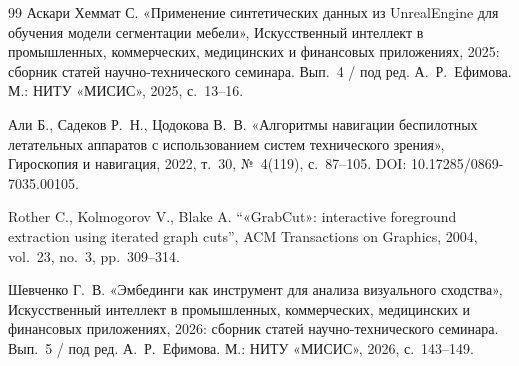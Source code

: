 \documentclass{misisarticle}
\begin{document}
\begin{thebibliography}{99}
 Аскари Хеммат С. «Применение синтетических данных из UnrealEngine для обучения модели сегментации мебели», Искусственный интеллект в промышленных, коммерческих, медицинских и финансовых приложениях, 2025: сборник статей научно-технического семинара. Вып.~4 / под ред. А.~Р.~Ефимова. М.: НИТУ «МИСИС», 2025, с.~13--16.

 Али Б., Садеков Р.~Н., Цодокова В.~В. «Алгоритмы навигации беспилотных летательных аппаратов с использованием систем технического зрения», Гироскопия и навигация, 2022, т.~30, №~4(119), с.~87--105. DOI: 10.17285/0869-7035.00105.

 Rother C., Kolmogorov V., Blake A. “«GrabCut»: interactive foreground extraction using iterated graph cuts”, ACM Transactions on Graphics, 2004, vol.~23, no.~3, pp.~309--314.

 Шевченко Г.~В. «Эмбединги как инструмент для анализа визуального сходства», Искусственный интеллект в промышленных, коммерческих, медицинских и финансовых приложениях, 2026: сборник статей научно-технического семинара. Вып.~5 / под ред. А.~Р.~Ефимова. М.: НИТУ «МИСИС», 2026, с.~143--149.

\end{thebibliography}
\end{document}
